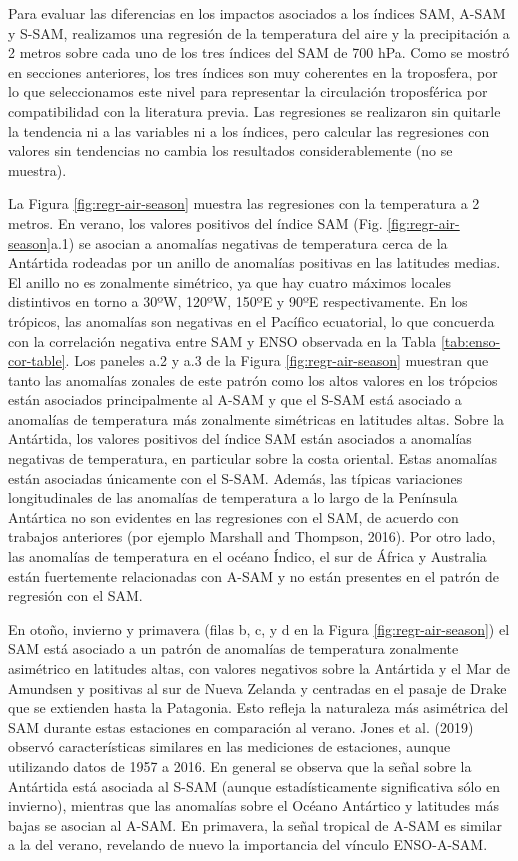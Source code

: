\documentclass[12pt,oneside]{reedthesis}
\begin{document}
Para evaluar las diferencias en los impactos asociados a los índices SAM, A-SAM y S-SAM, realizamos una regresión de la temperatura del aire y la precipitación a 2 metros sobre cada uno de los tres índices del SAM de 700 hPa.
Como se mostró en secciones anteriores, los tres índices son muy coherentes en la troposfera, por lo que seleccionamos este nivel para representar la circulación troposférica por compatibilidad con la literatura previa.
Las regresiones se realizaron sin quitarle la tendencia ni a las variables ni a los índices, pero calcular las regresiones con valores sin tendencias no cambia los resultados considerablemente (no se muestra).

La Figura \ref{fig:regr-air-season} muestra las regresiones con la temperatura a 2 metros.
En verano, los valores positivos del índice SAM (Fig. \ref{fig:regr-air-season}a.1) se asocian a anomalías negativas de temperatura cerca de la Antártida rodeadas por un anillo de anomalías positivas en las latitudes medias.
El anillo no es zonalmente simétrico, ya que hay cuatro máximos locales distintivos en torno a 30ºW, 120ºW, 150ºE y 90ºE respectivamente.
En los trópicos, las anomalías son negativas en el Pacífico ecuatorial, lo que concuerda con la correlación negativa entre SAM y ENSO observada en la Tabla \ref{tab:enso-cor-table}.
Los paneles a.2 y a.3 de la Figura \ref{fig:regr-air-season} muestran que tanto las anomalías zonales de este patrón como los altos valores en los trópcios están asociados principalmente al A-SAM y que el S-SAM está asociado a anomalías de temperatura más zonalmente simétricas en latitudes altas.
Sobre la Antártida, los valores positivos del índice SAM están asociados a anomalías negativas de temperatura, en particular sobre la costa oriental.
Estas anomalías están asociadas únicamente con el S-SAM.
Además, las típicas variaciones longitudinales de las anomalías de temperatura a lo largo de la Península Antártica no son evidentes en las regresiones con el SAM, de acuerdo con trabajos anteriores (por ejemplo Marshall and Thompson, 2016).
Por otro lado, las anomalías de temperatura en el océano Índico, el sur de África y Australia están fuertemente relacionadas con A-SAM y no están presentes en el patrón de regresión con el SAM.

En otoño, invierno y primavera (filas b, c, y d en la Figura \ref{fig:regr-air-season}) el SAM está asociado a un patrón de anomalías de temperatura zonalmente asimétrico en latitudes altas, con valores negativos sobre la Antártida y el Mar de Amundsen y positivas al sur de Nueva Zelanda y centradas en el pasaje de Drake que se extienden hasta la Patagonia.
Esto refleja la naturaleza más asimétrica del SAM durante estas estaciones en comparación al verano.
Jones et al. (2019) observó características similares en las mediciones de estaciones, aunque utilizando datos de 1957 a 2016.
En general se observa que la señal sobre la Antártida está asociada al S-SAM (aunque estadísticamente significativa sólo en invierno), mientras que las anomalías sobre el Océano Antártico y latitudes más bajas se asocian al A-SAM.
En primavera, la señal tropical de A-SAM es similar a la del verano, revelando de nuevo la importancia del vínculo ENSO-A-SAM.
\end{document}
